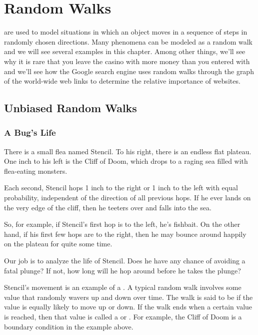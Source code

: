\chapter{Random Walks}\label{ran_process_chap}

 are used to model situations in which an object
moves in a sequence of steps in randomly chosen directions.  Many
phenomena can be modeled as a random walk and we will see several
examples in this chapter.  Among other things, we'll see why it is
rare that you leave the casino with more money than you entered with
and we'll see how the Google search engine uses random walks through
the graph of the world-wide web links to determine the relative
importance of websites.

\section{Unbiased Random Walks}

\subsection{A Bug's Life}

There is a small flea named Stencil.  To his right, there is an
endless flat plateau.  One inch to his left is the Cliff of Doom,
which drops to a raging sea filled with flea-eating monsters.
%
\begin{figure}[h]

\end{figure}

Each second, Stencil hops 1 inch to the right or 1 inch to the left
with equal probability, independent of the direction of all previous
hops.  If he ever lands on the very edge of the cliff, then he teeters
over and falls into the sea.
%
\begin{figure}[h]
\end{figure}
%
So, for example, if Stencil's first hop is to the left, he's fishbait.
On the other hand, if his first few hops are to the right, then he may
bounce around happily on the plateau for quite some time.

Our job is to analyze the life of Stencil.  Does he have any chance of
avoiding a fatal plunge?  If not, how long will he hop around before
he takes the plunge?

Stencil's movement is an example of a .  A typical
 random walk involves some value that randomly
wavers up and down over time.  The walk is said to be 
if the value is equally likely to move up or down.  If the walk ends
when a certain value is reached, then that value is called a
 or .  For example,
the Cliff of Doom is a boundary condition in the example above.

